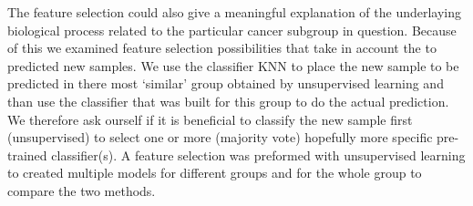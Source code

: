 \documentclass[a4paper]{article}
\begin{document}
								

The feature selection could also give a meaningful explanation of the underlaying biological process related to the particular cancer subgroup in question.  Because of this we examined feature selection possibilities that take in account the to predicted new samples. We use the classifier KNN to place the new sample to be predicted in there most `similar' group obtained by unsupervised learning and than use the classifier that was built for this group to do the actual prediction. We therefore ask ourself if it is beneficial to classify the new sample first (unsupervised) to select one or more (majority vote) hopefully more specific pre-trained classifier(s). A feature selection was preformed with unsupervised learning to created multiple models for different groups and for the whole group to compare the two methods. 





\end{document}

